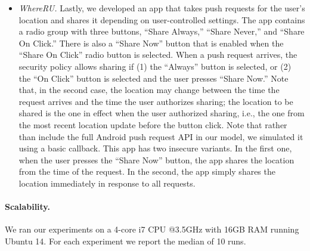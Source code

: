 \documentclass{llncs}
\newcommand{\code}[1]{\textsf{#1}} %
\newcommand{\tfuture}{\mathcal{F}}
\begin{document}
\begin{itemize}[leftmargin=*]
\item \textit{WhereRU.} Lastly, we developed an app
  that takes push requests for the user's location and shares it depending
  on user-controlled settings.
  The app contains a radio group with three buttons, ``Share Always,'' ``Share
  Never,'' and ``Share On Click.'' There is also a ``Share Now'' button that
  is enabled when the ``Share On Click'' radio button is selected.  When a
  push request arrives, the security policy allows sharing if (1) the ``Always''
  button is selected, or (2) the ``On Click'' button is selected and the user
  presses ``Share Now.'' Note that, in the second case, the location may
  change between the time the request arrives and the time the user authorizes
  sharing; the location to be shared is the one in effect when the user
  authorized sharing, i.e., the one from the most recent location update
  before the button click. Note that rather than include the full
  Android push request API in our model, we simulated it using a basic callback.
  This app has two insecure variants. In the first one, when the user
  presses the ``Share Now'' button, the app shares the location from the time
  of the request. In the second, the app simply
  shares the location immediately in response to all requests.


\end{itemize}



\paragraph*{Scalability.}
We ran our experiments on a 4-core i7 CPU @3.5GHz with 16GB
RAM running Ubuntu 14. For each experiment we report the median of 10
runs.
\end{document}
